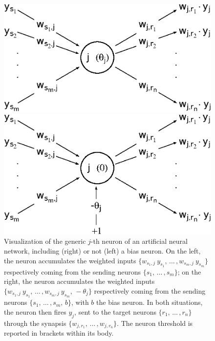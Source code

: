 \documentclass[longtitle]{elsarticle}
\numberwithin{equation}{section}
\theoremstyle{theorem}
\theoremstyle{definition}
\theoremstyle{remark}
\theoremstyle{proposition}
\numberwithin{figure}{section}
\begin{document}
		\begin{figure}[t]
			\begin{minipage}{0.49\textwidth}
				\center
				\vspace*{-0.35cm}
				\includegraphics[scale = 0.55]{neural_model.eps}
			\end{minipage}
			\begin{minipage}{0.49\textwidth}
				\center
				\includegraphics[scale = 0.55]{neural_model_bias.eps}
			\end{minipage}
		
			\caption{Visualization of the generic $j$-th neuron of an artificial neural network, including (right) or not (left) a bias neuron. On the left, the neuron accumulates the weighted inputs $\big\lbrace w_{s_1,j} ~ y_{s_1}, \, \ldots \, , w_{s_m,j} ~ y_{s_m} \big\rbrace$ respectively coming from the sending neurons $\big\lbrace s_1, \, \ldots \, , s_m \big\rbrace$; on the right, the neuron accumulates the weighted inputs $\big\lbrace w_{s_1,j} ~ y_{s_1}, \, \ldots \, , w_{s_m,j} ~ y_{s_m}, \, -\theta_j \big\rbrace$ respectively coming from the sending neurons $\big\lbrace s_1, \, \ldots \, , s_m, \, b \big\rbrace$, with $b$ the bias neuron. In both situations, the neuron then fires $y_j$, sent to the target neurons $\big\lbrace r_1, \, \ldots \, , r_n \big\rbrace$ through the synapsis $\big\lbrace w_{j,r_1}, \, \ldots \, , w_{j,r_n} \big\rbrace$. The neuron threshold is reported in brackets within its body.} 
			\label{fig:neural-model}
		\end{figure}
		
\end{document}
